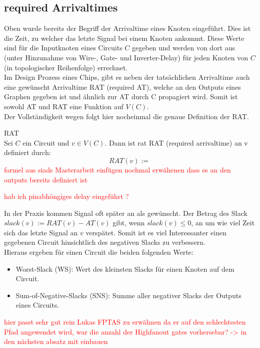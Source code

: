 \documentclass[11pt, a4paper, german]{article}
\begin{document}
\subsection{required Arrivaltimes}
Oben wurde bereits der Begriff der Arrivaltime eines Knoten eingeführt. Dies ist die Zeit, zu welcher das letzte Signal bei einem Knoten ankommt. Diese Werte sind für die Inputknoten eines Circuits $C$ gegeben und werden von dort aus (unter Hinzunahme von Wire-, Gate- und Inverter-Delay) für jeden Knoten von $C$ (in topologischer Reihenfolge) errechnet.\\
Im Design Prozess eines Chips, gibt es neben der tatsächlichen Arrivaltime auch eine  gewünscht Arrivaltime RAT (required AT), welche an den Outputs eines Graphen gegeben ist und ähnlich zur AT durch C propagiert wird. Somit ist sowohl AT und RAT eine Funktion auf $V(C)$. \\
Der Vollständigkeit wegen folgt hier nocheinmal die genaue Definition der RAT.\\

\begin{definition}{RAT}\\
	Sei $C$ ein Circuit und $v \in V(C)$. Dann ist rat RAT (required arrivaltime) an v definiert durch:
	\[   RAT(v) :=  \] \textcolor{red}{formel aus siads Masterarbeit einfügen nochmal erwähenen dass es an den outputs bereits definiert ist}
\end{definition}
\textcolor{red}{hab ich pinabhöngiges delay eingeführt ?}

In der Praxis kommen Signal oft später an als gewünscht. Der Betrag des Slack $slack(v) := RAT(v) - AT(v)$ gibt, wenn $slack(v) \leq 0 $, an um wie viel Zeit sich das letzte Signal an $v$ verspätet. Somit ist es viel Interessanter einen gegebenen Circuit hinsichtlich des negativen Slacks zu verbessern. \\
Hieraus ergeben für einen Circuit die beiden folgenden Werte: 
\begin{itemize}
	\item Worst-Slack (WS): Wert des kleinsten Slacks für einen Knoten auf dem Circuit.
	\item Sum-of-Negative-Slacks (SNS): Summe aller negativer Slacks der Outputs eines Circuits.
\end{itemize}

\textcolor{red}{hier passt sehr gut rein Lukas FPTAS zu erwähnen da er auf den schlechtesten Pfad angewendet wird, war die anzahl der Highfanout gates vorhersebar? -> in den nächsten absatz mit einbauen}\\
\end{document}
